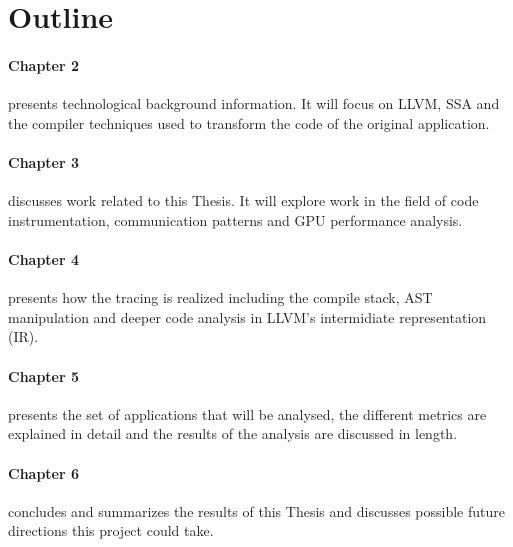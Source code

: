 \section{Outline}
	\paragraph{Chapter 2} presents technological background information. It will focus on LLVM, SSA and the compiler techniques used to transform the code of the original application.
	\paragraph{Chapter 3} discusses work related to this Thesis. It will explore work in the field of code instrumentation, communication patterns and GPU performance analysis.
	\paragraph{Chapter 4} presents how the tracing is realized including the compile stack, AST manipulation and deeper code analysis in LLVM's intermidiate representation (IR).
	\paragraph{Chapter 5} presents the set of applications that will be analysed, the different metrics are explained in detail and the results of the analysis are discussed in length.
	\paragraph{Chapter 6} concludes and summarizes the results of this Thesis and discusses possible future directions this project could take.
